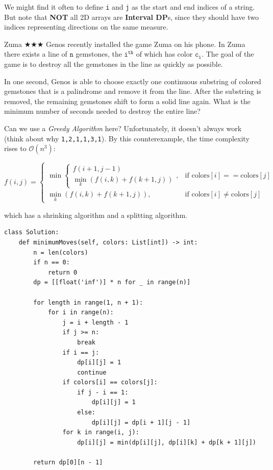 \documentclass{article}
\begin{document}
We might find it often to define \texttt{i} and \texttt{j} as the start and end indices of a string. But note that \textbf{NOT} all 2D arrays are \textbf{Interval DP}s, since they should have two indices representing directions on the same measure.

\begin{Question}{Zuma
 $\bigstar$$\bigstar$$\bigstar$}
Genos recently installed the game Zuma on his phone. In Zuma there exists a line of $\texttt n$ gemstones, the $\texttt{i}^{\texttt{th}}$ of which has color $\texttt{c}_{\texttt{i}}$. The goal of the game is to destroy all the gemstones in the line as quickly as possible.

In one second, Genos is able to choose exactly one continuous substring of colored gemstones that is a palindrome and remove it from the line. After the substring is removed, the remaining gemstones shift to form a solid line again. What is the minimum number of seconds needed to destroy the entire line?
\end{Question}

Can we use a \emph{Greedy Algorithm} here? Unfortunately, it doesn't always work (think about why \texttt{1,2,1,1,3,1}). By this counterexample, the time complexity rises to $\mathcal O(n^3)$:

$$
f(i,j) = \begin{cases} 
\min \begin{cases} 
f(i+1,j-1) \\ 
\displaystyle\min_k (f(i,k)+f(k+1,j)) 
\end{cases}, & \text{if colors}[i] == \text{colors}[j] \\ 
\displaystyle\min_k (f(i,k)+f(k+1,j)), & \text{if colors}[i] \neq \text{colors}[j] 
\end{cases}
$$

which has a shrinking algorithm and a splitting algorithm.

\begin{lstlisting}[style=python]
class Solution:
    def minimumMoves(self, colors: List[int]) -> int:
        n = len(colors)
        if n == 0:
            return 0
        dp = [[float('inf')] * n for _ in range(n)]
        
        for length in range(1, n + 1):
            for i in range(n):
                j = i + length - 1
                if j >= n:
                    break
                if i == j:
                    dp[i][j] = 1
                    continue
                if colors[i] == colors[j]:
                    if j - i == 1:
                        dp[i][j] = 1
                    else:
                        dp[i][j] = dp[i + 1][j - 1]
                for k in range(i, j):
                    dp[i][j] = min(dp[i][j], dp[i][k] + dp[k + 1][j])
                    
        return dp[0][n - 1]
\end{lstlisting}
\end{document}
